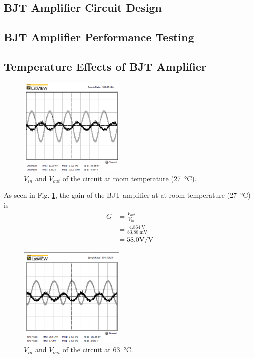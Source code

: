 \documentclass[journal]{IEEEtran}
\begin{document}
\subsection{BJT Amplifier Circuit Design}
\subsection{BJT Amplifier Performance Testing}
\subsection{Temperature Effects of BJT Amplifier}
\begin{figure}[h]
  \centering
  \includegraphics[width=0.45\textwidth]{images/27degree.png}
  \caption{$V_{in}$ and $V_{out}$ of the circuit at room temperature (\SI{27}{\celsius}).}
  \label{fig-3-1}
\end{figure}
As seen in Fig. \ref{fig-3-1}, the gain of the BJT amplifier at at room temperature (\SI{27}{\celsius}) is
\begin{equation*}
  \begin{split}
    G&=\frac{V_{out}}{V_{in}}\\
    &=\frac{\SI{4.864}{\volt}}{\SI{83.88}{\milli\volt}}\\
    &=58.0 \si{\volt}/\si{\volt}
  \end{split}
\end{equation*}
\begin{figure}[h]
  \centering
  \includegraphics[width=0.45\textwidth]{images/63degree.png}
  \caption{$V_{in}$ and $V_{out}$ of the circuit at \SI{63}{\celsius}.}
  \label{fig-3-2}
\end{figure}
\end{document}
